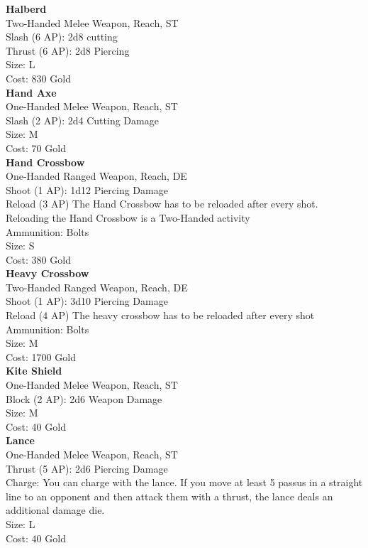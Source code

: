 \textbf{Halberd}\\
Two-Handed Melee Weapon,  Reach, ST\\
Slash (6 AP): 2d8 cutting\\
Thrust (6 AP): 2d8 Piercing\\
Size: L\\
Cost: 830 Gold\\


\textbf{Hand Axe}\\
One-Handed Melee Weapon,  Reach, ST\\
Slash (2 AP): 2d4 Cutting Damage\\
Size: M\\
Cost: 70 Gold\\


\textbf{Hand Crossbow}\\
One-Handed Ranged Weapon,  Reach, DE\\
Shoot (1 AP): 1d12 Piercing Damage\\
Reload (3 AP) The Hand Crossbow has to be reloaded after every shot.\\
Reloading the Hand Crossbow is a Two-Handed activity\\
Ammunition: Bolts\\
Size: S\\
Cost: 380 Gold\\


\textbf{Heavy Crossbow}\\
Two-Handed Ranged Weapon,  Reach, DE\\
Shoot (1 AP): 3d10 Piercing Damage\\
Reload (4 AP) The heavy crossbow has to be reloaded after every shot\\
Ammunition: Bolts\\
Size: M\\
Cost: 1700 Gold\\


\textbf{Kite Shield}\\
One-Handed Melee Weapon,  Reach, ST\\
Block (2 AP): 2d6 Weapon Damage\\
Size: M\\
Cost: 40 Gold\\


\textbf{Lance}\\
One-Handed Melee Weapon,  Reach, ST\\
Thrust (5 AP): 2d6 Piercing Damage\\
Charge: You can charge with the lance. If you move at least 5 passus in a straight line to an opponent and then attack them with a thrust, the lance deals an additional damage die.\\
Size: L\\
Cost: 40 Gold\\


